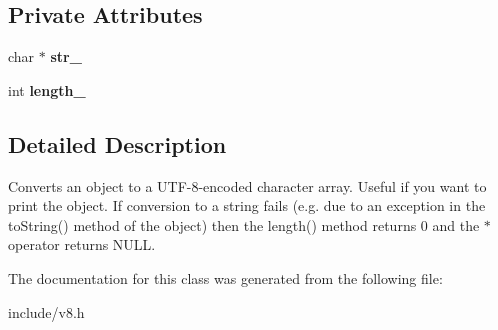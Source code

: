 \subsection*{Private Attributes}
\begin{DoxyCompactItemize}
\item 
char $\ast$ {\bfseries str\+\_\+}\hypertarget{classv8_1_1_string_1_1_utf8_value_a474e69f2de2bedc21bc99da7f834b9a4}{}\label{classv8_1_1_string_1_1_utf8_value_a474e69f2de2bedc21bc99da7f834b9a4}

\item 
int {\bfseries length\+\_\+}\hypertarget{classv8_1_1_string_1_1_utf8_value_a978cd108332a3fc9956f08eadb18c080}{}\label{classv8_1_1_string_1_1_utf8_value_a978cd108332a3fc9956f08eadb18c080}

\end{DoxyCompactItemize}


\subsection{Detailed Description}
Converts an object to a U\+T\+F-\/8-\/encoded character array. Useful if you want to print the object. If conversion to a string fails (e.\+g. due to an exception in the to\+String() method of the object) then the length() method returns 0 and the $\ast$ operator returns N\+U\+LL. 

The documentation for this class was generated from the following file\+:\begin{DoxyCompactItemize}
\item 
include/v8.\+h\end{DoxyCompactItemize}
